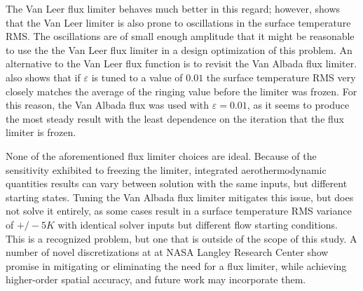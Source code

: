 The Van Leer flux limiter behaves much better in this regard; however,
 shows that the Van Leer limiter is also prone to
oscillations in the surface temperature RMS.  The oscillations are of small
enough amplitude that it might be reasonable to use the the Van Leer flux
limiter in a design optimization of this problem.  An alternative to the Van
Leer flux function is to revisit the Van Albada flux limiter.
 also shows that if $\varepsilon$ is tuned to a value of
$0.01$ the surface temperature RMS very closely matches the average of the
ringing value before the limiter was frozen.  For this reason, the Van Albada
flux was used with $\varepsilon = 0.01$, as it seems to produce the most steady
result with the least dependence on the iteration that the flux limiter is
frozen.

None of the aforementioned flux limiter choices are ideal.  Because of the
sensitivity exhibited to freezing the limiter, integrated aerothermodynamic
quantities results can vary between solution with the same inputs, but different
starting states.  Tuning the Van Albada flux limiter mitigates this issue, but
does not solve it entirely, as some cases result in a surface temperature RMS
variance of $+/- 5 K$ with identical solver inputs but different flow starting
conditions. This is a recognized problem, but one that is outside of the scope
of this study.  A number of novel discretizations at at NASA Langley Research
Center\cite{gnoffo2014global,mazaheri2014very,mazaheri2016high} show promise in
mitigating or eliminating the need for a flux limiter, while achieving
higher-order spatial accuracy, and future work may incorporate them.
